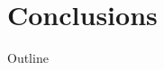 \documentclass{beamer}
\begin{document}

\begin{frame}
\frametitle{}
\end{frame}


\section{Conclusions}


\begin{frame}[noframenumbering]{Outline}
\end{frame}


\begin{frame}
\frametitle{}
\end{frame}

\end{document}
